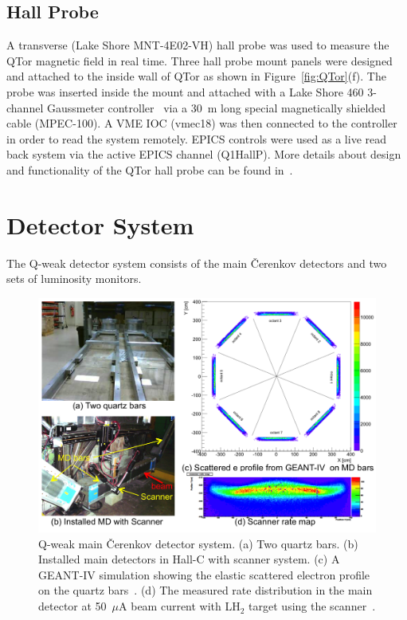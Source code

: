 \subsection{Hall Probe}
\label{Hall Probe}

A transverse (Lake Shore MNT-4E02-VH) hall probe was used to measure the QTor magnetic field in real time. Three hall probe mount panels were designed and attached to the inside wall of QTor as shown in Figure~\ref{fig:QTor}(f). The probe was inserted inside the mount and attached with a Lake Shore 460 3-channel Gaussmeter controller~\cite{manual_hall_probe} via a 30~m long special magnetically shielded cable (MPEC-100). A VME IOC (vmec18) was then connected to the controller in order to read the system remotely.  EPICS controls were used as a live read back system via the active EPICS channel (Q1HallP). More details about design and functionality of the QTor hall probe can be found in~\cite{nur_qtor_hallprobe}.


\section{Detector System}%
\label{Detector System}

The Q-weak detector system consists of the main \v{C}erenkov detectors and two sets of luminosity monitors.  

\begin{singlespace}
\begin{figure}[!h]
	\begin{center}
	\includegraphics[width=15cm]{figures/main_detector}
	\caption
	{Q-weak main \v{C}erenkov detector system. (a) Two quartz bars. (b) Installed main detectors in Hall-C with scanner system. (c) A GEANT-IV simulation showing the elastic scattered electron profile on the quartz bars~\cite{elog:peiqing_analysis588}. (d) The measured rate distribution in the main detector at 50~$\mu$A beam current with LH$_{2}$ target using the scanner~\cite{jie_qweak_thesis}. }
	\label{fig:main_detector}
	\end{center}
\end{figure}
\end{singlespace}

